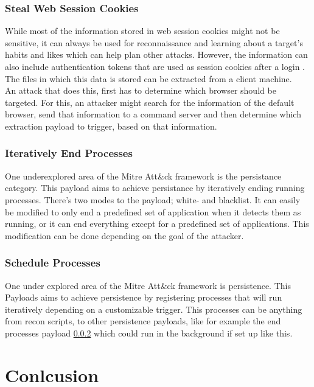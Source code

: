 \subsubsection{Steal Web Session Cookies}

While most of the information stored in web session cookies might not be sensitive, it can always be used for reconnaissance and learning about a target's habits and likes which can help plan other attacks. However, the information can also include authentication tokens that are used as session cookies after a login \cite{StealWebSession}. The files in which this data is stored can be extracted from a client machine. \\
An attack that does this, first has to determine which browser should be targeted. For this, an attacker might search for the information of the default browser, send that information to a command server and then determine which extraction payload to trigger, based on that information. 


\subsubsection{Iteratively End Processes} \label{Iteratively End Processes}

One underexplored area of the Mitre Att\&ck framework is the persistance category. This payload aims to achieve persistance by iteratively ending running processes. There's two modes to the payload; white- and blacklist. It can easily be modified to only end a predefined set of application when it detects them as running, or it can end everything except for a predefined set of applications. This modification can be done depending on the goal of the attacker. 


\subsubsection{Schedule Processes}

One under explored area of the Mitre Att\&ck framework is persistence. This Payloads aims to achieve persistence by registering processes that will run iteratively depending on a customizable trigger. This processes can be anything from recon scripts, to other persistence payloads, like for example the end processes payload \ref{Iteratively End Processes} which could run in the background if set up like this.


\section{Conlcusion}


